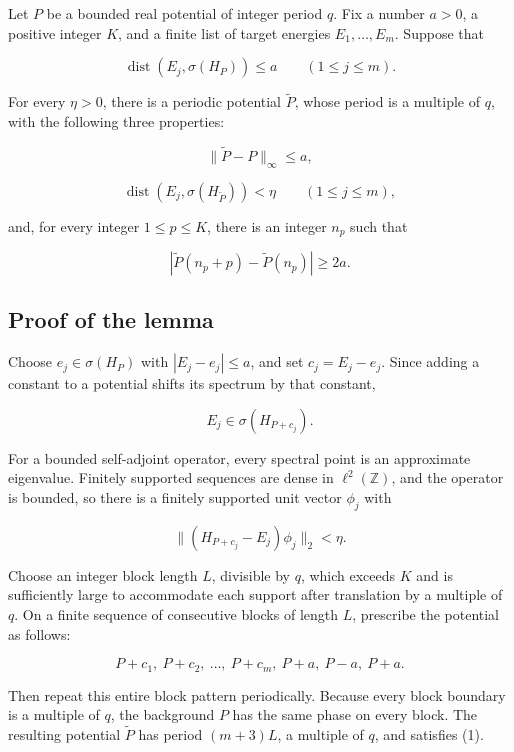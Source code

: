 \documentclass[11pt,a4paper]{article}
\begin{document}
Let \(P\) be a bounded real potential of integer period \(q\). Fix a
number \(a>0\), a positive integer \(K\), and a finite list of target
energies \(E_1,\ldots,E_m\). Suppose that

\[
\operatorname{dist}(E_j,\sigma(H_P))\leq a
\qquad(1\leq j\leq m).
\]

For every \(\eta>0\), there is a periodic potential \(\widetilde P\),
whose period is a multiple of \(q\), with the following three
properties:

\[
\|\widetilde P-P\|_\infty\leq a,
\tag{1}
\]

\[
\operatorname{dist}(E_j,\sigma(H_{\widetilde P}))<\eta
\qquad(1\leq j\leq m),
\tag{2}
\]

and, for every integer \(1\leq p\leq K\), there is an integer \(n_p\)
such that

\[
|\widetilde P(n_p+p)-\widetilde P(n_p)|\geq2a.
\tag{3}
\]

\hypertarget{1031-proof-of-the-lemma}{%
\subsection{Proof of the lemma}\label{1031-proof-of-the-lemma}}

Choose \(e_j\in\sigma(H_P)\) with \(|E_j-e_j|\leq a\), and set
\(c_j=E_j-e_j\). Since adding a constant to a potential shifts its
spectrum by that constant,

\[
E_j\in\sigma(H_{P+c_j}).
\]

For a bounded self-adjoint operator, every spectral point is an
approximate eigenvalue. Finitely supported sequences are dense in
\(\ell^2(\mathbb Z)\), and the operator is bounded, so there is a
finitely supported unit vector \(\phi_j\) with

\[
\|(H_{P+c_j}-E_j)\phi_j\|_2<\eta.
\tag{4}
\]

Choose an integer block length \(L\), divisible by \(q\), which exceeds
\(K\) and is sufficiently large to accommodate each support after
translation by a multiple of \(q\). On a finite sequence of consecutive
blocks of length \(L\), prescribe the potential as follows:

\[
P+c_1,\ P+c_2,\ \ldots,\ P+c_m,\ P+a,\ P-a,\ P+a.
\tag{5}
\]

Then repeat this entire block pattern periodically. Because every block
boundary is a multiple of \(q\), the background \(P\) has the same phase
on every block. The resulting potential \(\widetilde P\) has period
\((m+3)L\), a multiple of \(q\), and satisfies (1).
\end{document}
